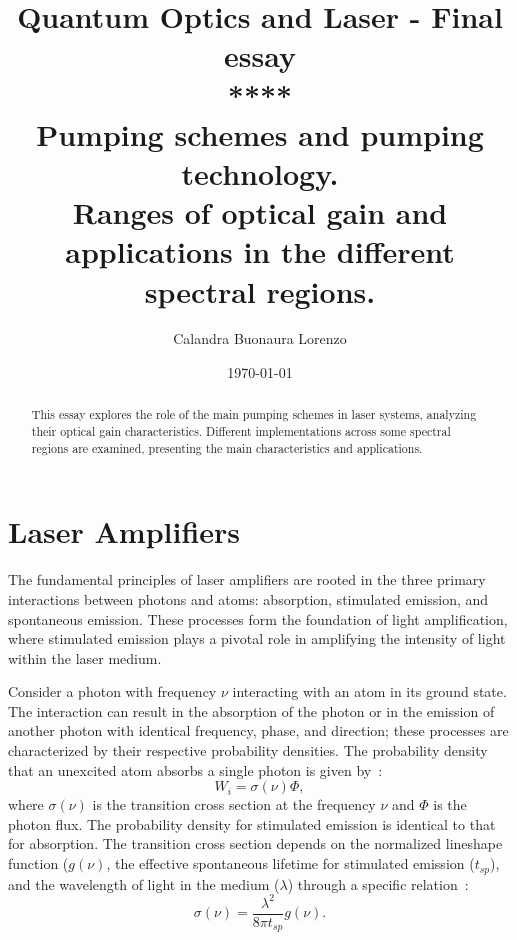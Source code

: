 \documentclass[prl,twocolumn]{revtex4-1}
\begin{document}
\title{Quantum Optics and Laser - Final essay \\ **** \\ \Large{Pumping schemes and pumping technology. \\Ranges of optical gain and applications in the different spectral regions.}}



\author{Calandra Buonaura Lorenzo}

\date{\today}

\begin{abstract}
This essay explores the role of the main pumping schemes in laser systems, analyzing their optical gain characteristics. Different implementations across some spectral regions are examined, presenting the main characteristics and applications.
\end{abstract}

\maketitle

\section{Laser Amplifiers}
The fundamental principles of laser amplifiers are rooted in the three primary interactions between photons and atoms: absorption, stimulated emission, and spontaneous emission. These processes form the foundation of light amplification, where stimulated emission plays a pivotal role in amplifying the intensity of light within the laser medium. 

Consider a photon with frequency $\nu$ interacting with an atom in its ground state. The interaction can result in the absorption of the photon or in the emission of another photon with identical frequency, phase, and direction; these processes are characterized by their respective probability densities. The probability density that an unexcited atom absorbs a single photon is given by~\cite{Saleh2007}:
%
\begin{equation}
    \label{eq:probability_density}
    W_i = \sigma(\nu) \Phi,
\end{equation}
%
where $\sigma(\nu)$ is the transition cross section at the frequency $\nu$ and $\Phi$ is the photon flux. The probability density for stimulated emission is identical to that for absorption. The transition cross section depends on the normalized lineshape function ($g(\nu)$, the effective spontaneous lifetime for stimulated emission ($t_{sp}$), and the wavelength of light in the medium ($\lambda$) through a specific relation~\cite{Saleh2007}:  
%
\begin{equation}
    \sigma(\nu) = \frac{\lambda^2}{8 \pi t_{sp}} g(\nu).
\end{equation}
\end{document}
